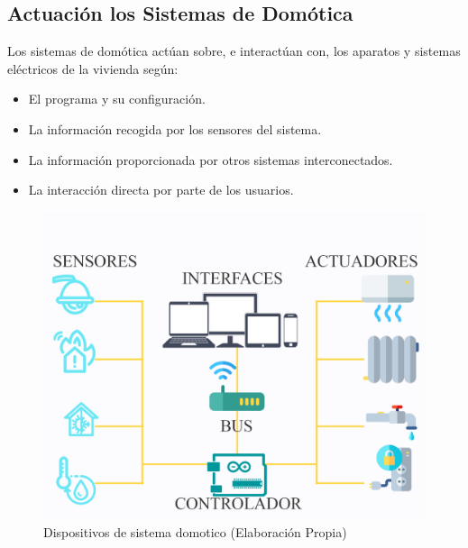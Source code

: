 \documentclass[11pt,letterpaper]{report}
\begin{document}
		\subsection{Actuación los Sistemas de Domótica}
		Los sistemas de domótica actúan sobre, e interactúan con, los aparatos y sistemas eléctricos de la vivienda según:
		\begin{itemize}
		\item El programa y su configuración.
		\item La información recogida por los sensores del sistema.
		\item La información proporcionada por otros sistemas interconectados.
		\item La interacción directa por parte de los usuarios.		
		\end{itemize}
		\begin{figure}[ht]
			\centering
			\includegraphics[scale=0.2]{imagenes/domotica_componentes.png}
			\caption{Dispositivos de sistema domotico (Elaboración Propia)}
			\label{domotica_componentes} 
		\end{figure}
\end{document}
